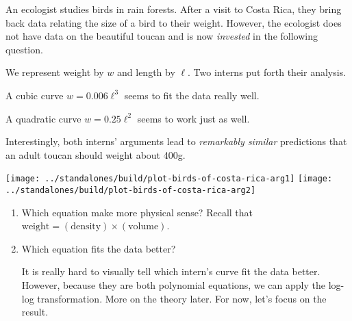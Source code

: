\documentclass[../main.tex]{subfiles}
\begin{document}
\begin{example} \label{ex:toucan}
  An ecologist studies birds in rain forests. After a visit to Costa Rica, they bring back data relating the size of a bird to their weight. However, the ecologist does not have data on the beautiful toucan and is now \emph{invested} in the following question.

  \begin{center}
  \end{center}

  We represent weight by \(w\) and length by \(\ell\). Two interns put forth their analysis. 
  \begin{description}[wide]
    \item[Intern A.] A cubic curve \(w = 0.006 \ell^{3}\) seems to fit the data really well.
    \item[Intern B.] A quadratic curve \(w = 0.25 \ell^{2}\) seems to work just as well.
  \end{description}

  Interestingly, both interns' arguments lead to \emph{remarkably similar} predictions that an adult toucan should weight about 400g. 

  \texttt{[image: ../standalones/build/plot-birds-of-costa-rica-arg1]}
  \texttt{[image: ../standalones/build/plot-birds-of-costa-rica-arg2]}


  \begin{enumerate}[wide]
    \item Which equation make more physical sense? Recall that \(\text{weight} = (\text{density}) \times (\text{volume})\). 

    \item Which equation fits the data better? 

      It is really hard to visually tell which intern's curve fit the data better. However, because they are both polynomial equations, we can apply the log-log transformation. More on the theory later. For now, let's focus on the result.



\end{enumerate}
\end{example}
\end{document}
